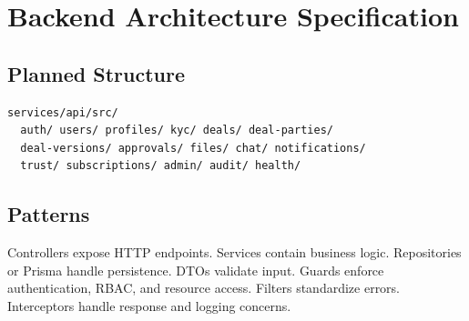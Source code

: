 \chapter{Backend Architecture Specification}
\section{Planned Structure}
\begin{lstlisting}
services/api/src/
  auth/ users/ profiles/ kyc/ deals/ deal-parties/
  deal-versions/ approvals/ files/ chat/ notifications/
  trust/ subscriptions/ admin/ audit/ health/
\end{lstlisting}
\section{Patterns}
Controllers expose HTTP endpoints. Services contain business logic. Repositories or Prisma handle persistence. DTOs validate input. Guards enforce authentication, RBAC, and resource access. Filters standardize errors. Interceptors handle response and logging concerns.

